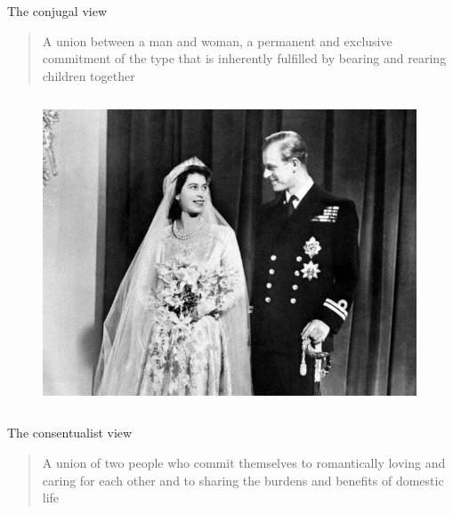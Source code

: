 \documentclass[xcolor=dvipsnames]{beamer}
\begin{document}
\begin{frame}{The conjugal view}
\begin{quote}
A union between a man and woman, a permanent and exclusive commitment of the type that is inherently fulfilled by bearing and rearing children together
\end{quote}
\end{frame}


\begin{frame}[plain]
  \begin{columns}[T] %
    \begin{column}{0.9\textwidth}
      \begin{figure}[H]
        \centering
        \includegraphics[width=0.99\textwidth]{conjugal}
      \end{figure}
    \end{column}%
  \end{columns}
\end{frame}


\begin{frame}{The consentualist view}
\begin{quote}
A union of two people who commit themselves to romantically loving and caring for each other and to sharing the burdens and benefits of domestic life
\end{quote}
\end{frame}
\end{document}
